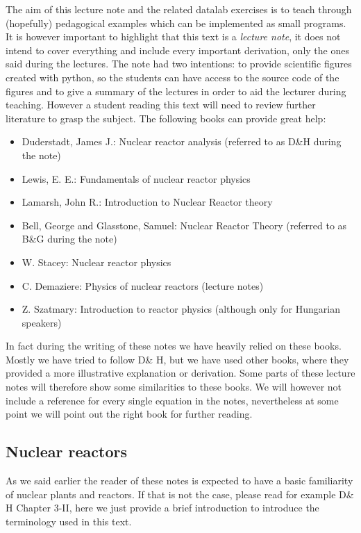 The aim of this lecture note and the related datalab exercises is to teach through (hopefully) pedagogical examples which can be implemented as small programs. It is however important to highlight that this text is a \textit{lecture note}, it does not intend to cover everything and include every important derivation, only the ones said during the lectures. The note had two intentions: to provide scientific figures created with python, so the students can have access to the source code of the figures and to give a summary of the lectures in order to aid the lecturer during teaching. However a student reading this text will need to review further literature to grasp the subject. The following books can provide great help:

\begin{itemize}
\item Duderstadt, James J.: Nuclear reactor analysis (referred to as D\&H during the note)
\item Lewis, E. E.: Fundamentals of nuclear reactor physics
\item Lamarsh, John R.: Introduction to Nuclear Reactor theory
\item Bell, George and Glasstone, Samuel: Nuclear Reactor Theory (referred to as B\&G during the note)
\item W. Stacey: Nuclear reactor physics
\item C. Demaziere: Physics of nuclear reactors (lecture notes)
\item Z. Szatmary: Introduction to reactor physics (although only for Hungarian speakers)
\end{itemize}

In fact during the writing of these notes we have heavily relied on these books. Mostly we have tried to follow D\& H, but we have used other books, where they provided a more illustrative explanation or derivation. Some parts of these lecture notes will therefore show some similarities to these books. We will however not include a reference for every single equation in the notes, nevertheless at some point we will point out the right book for further reading.

\subsection{Nuclear reactors}

As we said earlier the reader of these notes is expected to have a basic familiarity of nuclear plants and reactors. If that is not the case, please read for example D\& H Chapter 3-II, here we just provide a brief introduction to introduce the terminology used in this text.

